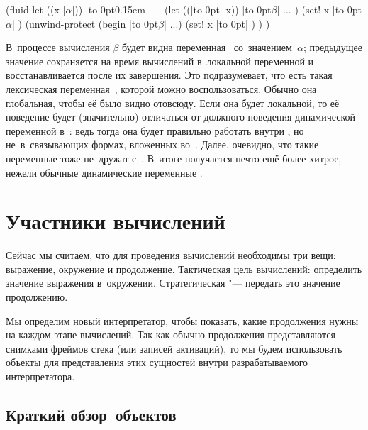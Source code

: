 {\def\A{\hbox to 0pt{$\alpha$}}
\def\B{\hbox to 0pt{$\beta$}}
\def\E{\hbox to 0pt{\kern0.15em$\equiv$}}
\def\T{\hbox to 0pt{}}
\begin{code:lisp}
(fluid-let ((x |$\alpha$|)) |\E|   (let ((|\T|    x))
  |\B| ... )                (set! x |\A| )
                        (unwind-protect
                          (begin |\B| ...)
                          (set! x |\T|   ) ) )
\end{code:lisp}}

В~процессе вычисления $\beta$ будет видна переменная~
со~значением~$\alpha$; предыдущее значение  сохраняется на время
вычислений в~локальной переменной  и восстанавливается после их
завершения. Это подразумевает, что есть такая лексическая переменная~,
которой можно воспользоваться. Обычно она глобальная, чтобы её было видно
отовсюду. Если она будет локальной, то её поведение будет (значительно)
отличаться от должного поведения динамической переменной в~{\CommonLisp}: ведь
тогда она будет правильно работать внутри , но не~в~связывающих
формах, вложенных во~. Далее, очевидно, что такие переменные тоже
не~дружат с~. В~итоге получается нечто ещё более хитрое, нежели
обычные динамические переменные {\CommonLisp}.


\section{Участники вычислений}\label{escape/sect:actors}

Сейчас мы считаем, что для проведения вычислений необходимы три вещи: выражение,
окружение и продолжение. Тактическая цель вычислений: определить значение
выражения в~окружении. Стратегическая "--- передать это значение продолжению.

Мы определим новый интерпретатор, чтобы показать, какие продолжения нужны на
каждом этапе вычислений. Так как обычно продолжения представляются снимками
фреймов стека (или записей активаций), то мы будем использовать объекты для
представления этих сущностей внутри разрабатываемого интерпретатора.


\subsection{Краткий обзор~объектов}\label{escape/actors/ssect:review}

